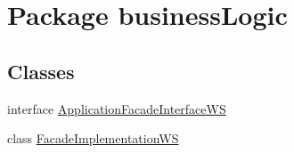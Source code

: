 \hypertarget{namespacebusinessLogic}{}\section{Package business\+Logic}
\label{namespacebusinessLogic}
\subsection*{Classes}
\begin{DoxyCompactItemize}
\item 
interface \mbox{\hyperlink{interfacebusinessLogic_1_1ApplicationFacadeInterfaceWS}{Application\+Facade\+Interface\+WS}}
\item 
class \mbox{\hyperlink{classbusinessLogic_1_1FacadeImplementationWS}{Facade\+Implementation\+WS}}
\end{DoxyCompactItemize}
